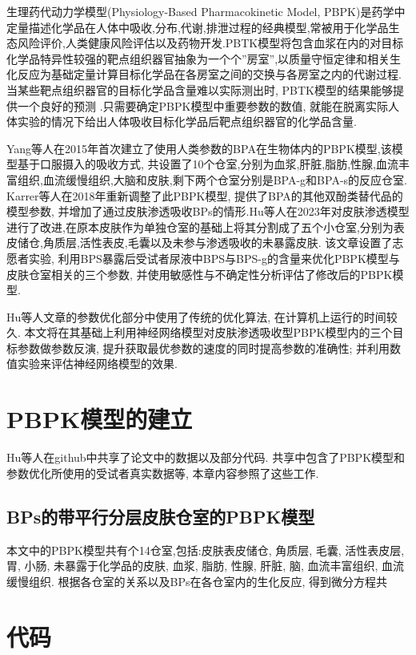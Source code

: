 \documentclass[a4paper,punct=banjiao,twoside]{ctexrep}
\theoremstyle{plain}
\theoremstyle{definition}
\theoremstyle{remark}
\begin{document}
生理药代动力学模型(Physiology-Based Pharmacokinetic Model, PBPK)是药学中定量描述化学品在人体中吸收,分布,代谢,排泄过程的经典模型,常被用于化学品生态风险评价,人类健康风险评估以及药物开发\cite{7}.PBTK模型将包含血浆在内的对目标化学品特异性较强的靶点组织器官抽象为一个个”房室”,以质量守恒定律和相关生化反应为基础定量计算目标化学品在各房室之间的交换与各房室之内的代谢过程\cite{8}.当某些靶点组织器官的目标化学品含量难以实际测出时, PBTK模型的结果能够提供一个良好的预测 \cite{7}.只需要确定PBPK模型中重要参数的数值, 就能在脱离实际人体实验的情况下给出人体吸收目标化学品后靶点组织器官的化学品含量.

Yang等人在2015年首次建立了使用人类参数的BPA在生物体内的PBPK模型,该模型基于口服摄入的吸收方式, 共设置了10个仓室,分别为血浆,肝脏,脂肪,性腺,血流丰富组织,血流缓慢组织,大脑和皮肤,剩下两个仓室分别是BPA-g和BPA-s的反应仓室\cite{10}. Karrer等人在2018年重新调整了此PBPK模型, 提供了BPA的其他双酚类替代品的模型参数, 并增加了通过皮肤渗透吸收BPs的情形\cite{9}.Hu等人在2023年对皮肤渗透模型进行了改进,在原本皮肤作为单独仓室的基础上将其分割成了五个小仓室,分别为表皮储仓,角质层,活性表皮,毛囊以及未参与渗透吸收的未暴露皮肤\cite{11}.
该文章设置了志愿者实验, 利用BPS暴露后受试者尿液中BPS与BPS-g的含量来优化PBPK模型与皮肤仓室相关的三个参数, 并使用敏感性与不确定性分析评估了修改后的PBPK模型.

Hu等人文章的参数优化部分中使用了传统的优化算法, 在计算机上运行的时间较久. 本文将在其基础上利用神经网络模型对皮肤渗透吸收型PBPK模型内的三个目标参数做参数反演, 提升获取最优参数的速度的同时提高参数的准确性; 并利用数值实验来评估神经网络模型的效果.


\chapter{PBPK模型的建立}
Hu等人\cite{11}在github中共享了论文中的数据以及部分代码\cite{12}. 共享中包含了PBPK模型和参数优化所使用的受试者真实数据等, 本章内容参照了这些工作.
\section{BPs的带平行分层皮肤仓室的PBPK模型}
本文中的PBPK模型共有个14仓室,包括:皮肤表皮储仓, 角质层, 毛囊, 活性表皮层, 胃, 小肠, 未暴露于化学品的皮肤, 血浆, 脂肪, 性腺, 肝脏, 脑, 血流丰富组织, 血流缓慢组织. 
根据各仓室的关系以及BPs在各仓室内的生化反应, 得到微分方程共   



\clearpage
\mbox{}
\thispagestyle{empty}

\appendix
\chapter{代码}
\end{document}
